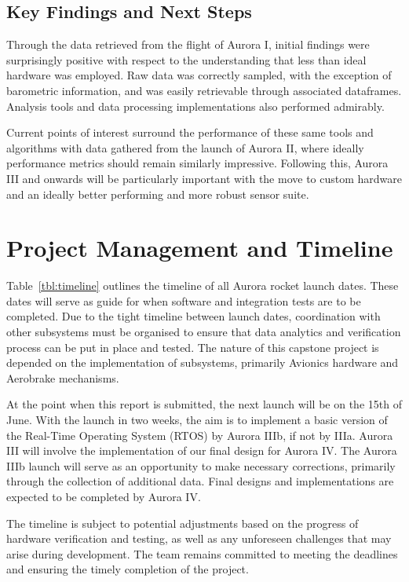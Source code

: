 \subsection{Key Findings and Next Steps}
Through the data retrieved from the flight of Aurora I, initial findings were surprisingly positive with respect to the understanding that less than ideal hardware was employed. Raw data was correctly sampled, with the exception of barometric information, and was easily retrievable through associated dataframes. Analysis tools and data processing implementations also performed admirably.

Current points of interest surround the performance of these same tools and algorithms with data gathered from the launch of Aurora II, where ideally performance metrics should remain similarly impressive. Following this, Aurora III and onwards will be particularly important with the move to custom hardware and an ideally better performing and more robust sensor suite.

\section{Project Management and Timeline}
Table~\ref{tbl:timeline} outlines the timeline of all Aurora rocket launch dates. These dates will serve as guide for when software and integration tests are to be completed. Due to the tight timeline between launch dates, coordination with other subsystems must be organised to ensure that data analytics and verification process can be put in place and tested. The nature of this capstone project is depended on the implementation of subsystems, primarily Avionics hardware and Aerobrake mechanisms.  

At the point when this report is submitted, the next launch will be on the 15th of June.  With the launch in two weeks, the aim is to implement a basic version of the Real-Time Operating System (RTOS) by Aurora IIIb, if not by IIIa. Aurora III will involve the implementation of our final design for Aurora IV. The Aurora IIIb launch will serve as an opportunity to make necessary corrections, primarily through the collection of additional data. Final designs and implementations are expected to be completed by Aurora IV.  

The timeline is subject to potential adjustments based on the progress of hardware verification and testing, as well as any unforeseen challenges that may arise during development. The team remains committed to meeting the deadlines and ensuring the timely completion of the project. 

